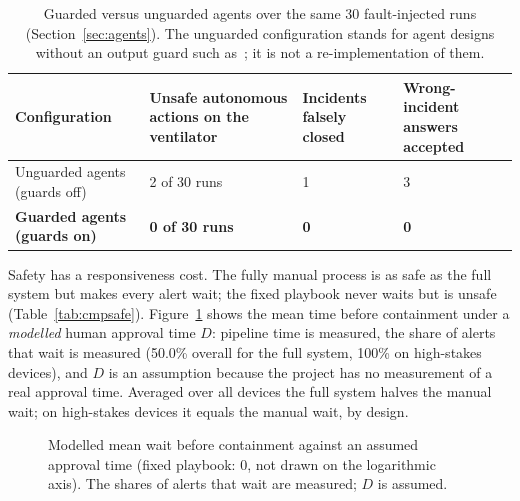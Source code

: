 \documentclass[preprint,12pt]{elsarticle}
\begin{document}
\begin{table}[htbp]
\centering
\caption{Guarded versus unguarded agents over the same 30 fault-injected runs (Section~\ref{sec:agents}). The unguarded configuration stands for agent designs without an output guard such as~\cite{lin2025,gao2026}; it is not a re-implementation of them.}
\label{tab:cmpguard}
\small
\begin{tabular}{@{}L{3.9cm}C{2.5cm}C{2.5cm}C{3.0cm}@{}}
\toprule
Configuration & Unsafe autonomous actions on the ventilator & Incidents falsely closed & Wrong-incident answers accepted \\
\midrule
Unguarded agents (guards off) & 2 of 30 runs & 1 & 3 \\
\textbf{Guarded agents (guards on)} & \textbf{0 of 30 runs} & \textbf{0} & \textbf{0} \\
\bottomrule
\end{tabular}
\end{table}

Safety has a responsiveness cost. The fully manual process is as safe as the full system but makes every alert wait; the fixed playbook never waits but is unsafe (Table~\ref{tab:cmpsafe}). Figure~\ref{fig:wait} shows the mean time before containment under a \emph{modelled} human approval time $D$: pipeline time is measured, the share of alerts that wait is measured (50.0\% overall for the full system, 100\% on high-stakes devices), and $D$ is an assumption because the project has no measurement of a real approval time. Averaged over all devices the full system halves the manual wait; on high-stakes devices it equals the manual wait, by design.

\begin{figure}[htbp]
\centering
{}
\caption{Modelled mean wait before containment against an assumed approval time (fixed playbook: 0, not drawn on the logarithmic axis). The shares of alerts that wait are measured; $D$ is assumed.}
\label{fig:wait}
\end{figure}
\end{document}
